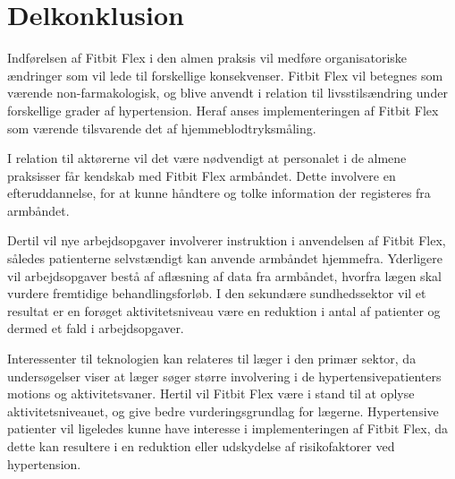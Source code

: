 \section{Delkonklusion}
Indførelsen af Fitbit Flex i den almen praksis vil medføre organisatoriske ændringer som vil lede til forskellige konsekvenser. Fitbit Flex vil betegnes som værende non-farmakologisk, og blive anvendt i relation til livsstilsændring under forskellige grader af hypertension. Heraf anses implementeringen af Fitbit Flex som værende tilsvarende det af hjemmeblodtryksmåling.

I relation til aktørerne vil det være nødvendigt at personalet i de almene praksisser får kendskab med Fitbit Flex armbåndet. Dette involvere en efteruddannelse, for at kunne håndtere og tolke information der registeres fra armbåndet. 

Dertil vil nye arbejdsopgaver involverer instruktion i anvendelsen af Fitbit Flex, således patienterne selvstændigt kan anvende armbåndet hjemmefra. Yderligere vil arbejdsopgaver bestå af aflæsning af data fra armbåndet, hvorfra lægen skal vurdere fremtidige behandlingsforløb. I den sekundære sundhedssektor vil et resultat er en forøget aktivitetsniveau være en reduktion i antal af patienter og dermed et fald i arbejdsopgaver. 

Interessenter til teknologien kan relateres til læger i den primær sektor, da undersøgelser viser at læger søger større involvering i de hypertensivepatienters motions og aktivitetsvaner. Hertil vil Fitbit Flex være i stand til at oplyse aktivitetsniveauet, og give bedre vurderingsgrundlag for lægerne. 
Hypertensive patienter vil ligeledes kunne have interesse i implementeringen af Fitbit Flex, da dette kan resultere i en reduktion eller udskydelse af risikofaktorer ved hypertension.  





\begin{comment}


Kan implementeres på samme vis som hjemmeblodtryksmåling. 
Implementeringen kan antages at lede til en reduktion af patienter ‘i primær og sekundær sektor/påvirke samspillet mellem primær og sekundær sektor’, da korrekt vejledning omkring motion kan reducere følgevirkningerne ved hypertension. 
Personale: For korrekt vejledning skal personale i den almene praksis oplæres i at forstå data fra armbåndet, og være i stand til at introducere patienter at anvende armbåndet.
\end{comment}
